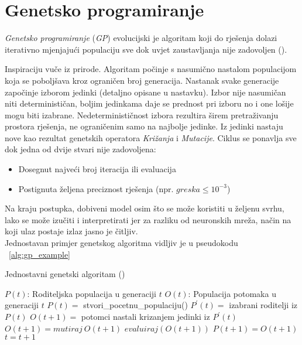 \section{Genetsko programiranje}
\emph{Genetsko programiranje} (\emph{GP}) evolucijski je algoritam koji do rješenja dolazi iterativno mjenjajući populaciju sve dok uvjet zaustavljanja nije zadovoljen (\cite{conv_gen_programming}).

Inspiraciju vuče iz prirode.
Algoritam počinje s nasumično nastalom populacijom koja se poboljšava kroz ograničen broj generacija.
Nastanak svake generacije započinje izborom jedinki (detaljno opisane u nastavku).
Izbor nije nasumičan niti determinističan, boljim jedinkama daje se prednost pri izboru no i one lošije mogu biti izabrane.
Nedeterminističnost izbora rezultira širem pretraživanju prostora rješenja, ne ograničenim samo na najbolje jedinke.
Iz jedinki nastaju nove kao rezultat genetskih operatora \emph{Križanja} i \emph{Mutacije}.
Ciklus se ponavlja sve dok jedna od dvije stvari nije zadovoljena:
\begin{itemize}
	\item{Dosegnut najveći broj iteracija ili evaluacija}
	\item{Postignuta željena preciznost rješenja (npr. $greska \leq 10^{-3}$})
\end{itemize}
Na kraju postupka, dobiveni model osim što se može koristiti u željenu svrhu, lako se može izučiti i interpretirati jer za razliku od neuronskih mreža, način na koji ulaz postaje izlaz jasno je čitljiv. \\
Jednostavan primjer genetskog algoritma vidljiv je u pseudokodu ~\ref{alg:gp_example}

\begin{algorithm}
	\caption{Jednostavni genetski algoritam (\cite{wong2015evolutionary})}
	\label{alg:gp_example}
	\begin{algorithmic}
		\STATE $P(t)$: Roditeljska populacija u generaciji $t$
		\STATE $O(t)$: Populacija potomaka u generaciji $t$
		\STATE $P(t)=$ stvori\_pocetnu\_populaciju()
			\STATE $P^{'}(t) =$ izabrani roditelji iz $P(t)$
			\STATE $O(t + 1) =$ potomci nastali krizanjem jedinki iz $P^{'}(t)$
			\STATE $O(t + 1) = mutiraj\ O(t + 1)$
			\STATE $evaluiraj(O(t + 1))$
			\STATE $P(t + 1) = O(t + 1)$
			\STATE $t = t + 1$
		\ENDWHILE
	\end{algorithmic}
\end{algorithm}

